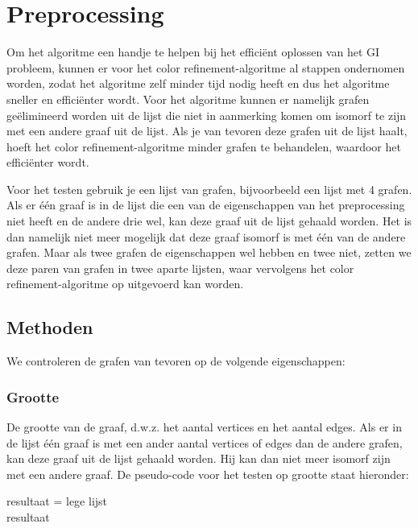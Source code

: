 \documentclass{article}
\begin{document}
\section{Preprocessing}
Om het algoritme een handje te helpen bij het effici\"ent oplossen van het GI probleem, kunnen er voor het color refinement-algoritme al stappen ondernomen worden, zodat het algoritme zelf minder tijd nodig heeft en dus het algoritme sneller en effici\"enter wordt.
Voor het algoritme kunnen er namelijk grafen ge\"elimineerd worden uit de lijst die niet in aanmerking komen om isomorf te zijn met een andere graaf uit de lijst. Als je van tevoren deze grafen uit de lijst haalt, hoeft het color refinement-algoritme minder grafen te behandelen, waardoor het effici\"enter wordt.

Voor het testen gebruik je een lijst van grafen, bijvoorbeeld een lijst met 4 grafen. Als er \'e\'en graaf is in de lijst die een van de eigenschappen van het preprocessing niet heeft en de andere drie wel, kan deze graaf uit de lijst gehaald worden. Het is dan namelijk niet meer mogelijk dat deze graaf isomorf is met \'e\'en van de andere grafen. Maar als twee grafen de eigenschappen wel hebben en twee niet, zetten we deze paren van grafen in twee aparte lijsten, waar vervolgens het color refinement-algoritme op uitgevoerd kan worden.

\subsection{Methoden}
We controleren de grafen van tevoren op de volgende eigenschappen:
\subsubsection{Grootte}
De grootte van de graaf, d.w.z. het aantal vertices en het aantal edges. Als er in de lijst één graaf is met een ander aantal vertices of edges dan de andere grafen, kan deze graaf uit de lijst gehaald worden. Hij kan dan niet meer isomorf zijn met een andere graaf. De pseudo-code voor het testen op grootte staat hieronder:\\

\begin{algorithm}[H]
	resultaat = lege lijst\\
	\Return resultaat
\end{algorithm}
\end{document}
